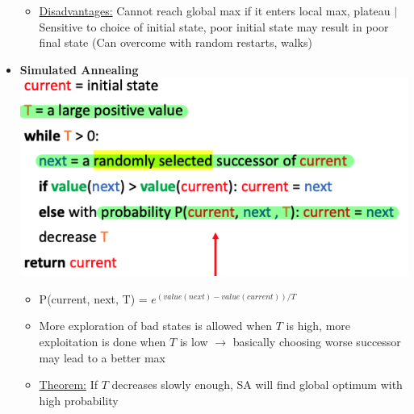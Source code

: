 \documentclass[landscape]{article}
\begin{document}
\begin{multicols*}{5}
\begin{itemize}
\begin{itemize}
        \item \underline{Disadvantages:} Cannot reach global max if it enters local max, plateau $\vert$ Sensitive to choice of initial state, poor initial state may result in poor final state (Can overcome with random restarts, walks)
      \end{itemize}
      \item \textbf{Simulated Annealing}
      \includegraphics[width=0.75\linewidth]{5_simulated_annealing.png}
      \begin{itemize}
        \item P(current, next, T) = $e^{(value(next) - value(current))/T}$
        \item More exploration of bad states is allowed when $T$ is high, more exploitation is done when $T$ is low $\rightarrow$ basically choosing worse successor may lead to a better max
        \item \underline{Theorem:} If $T$ decreases slowly enough, SA will find global optimum with high probability
      \end{itemize}
    \end{itemize}


\end{multicols*}
\end{document}
